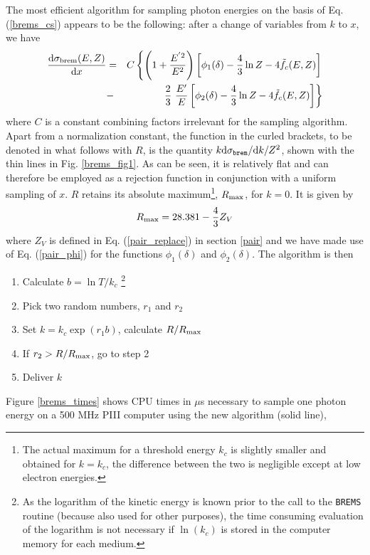 The most efficient algorithm for sampling photon energies on
the basis of Eq. (\ref{brems_cs}) appears to be the following:
after a change of variables from $k$ to $x$, we have
\begin{eqnarray}
{{\rm d} \sigma_{\rm brem}(E,Z) \over {\rm d} x} & = & C
\left\{ \left(1 + {E^{' 2} \over E^2} \right)
\left[ \phi_1(\delta) - \frac{4}{3} \ln Z - 4 \tilde{f}_c(E,Z) \right]
\right. \nonumber \\ & - & \left.
\frac{2}{3}~\frac{E'}{E} \left[\phi_2(\delta) -
\frac{4}{3} \ln Z - 4 \tilde{f}_c(E,Z) \right]
\right\}
\end{eqnarray}
where $C$ is a constant combining factors irrelevant for
the sampling algorithm. Apart from a normalization
constant, the function in the curled brackets, to be denoted
in what follows with $R$, is the
quantity $k {\rm d}\sigma_{\tt brem}/{\rm d}k/Z^2$, shown
with the thin lines in Fig. \ref{brems_fig1}. As can be seen,
it is relatively flat and can therefore be employed as a
rejection function in conjunction with a uniform sampling
of $x$. $R$ retains its absolute maximum\footnote{The actual maximum
for a threshold energy
$k_c$ is slightly smaller and obtained for $k=k_c$, the difference between the
two is negligible except at low electron energies.}, $R_{\rm max}$, for
$k = 0$. It is given by
\begin{equation}
R_{\rm max} = 28.381 - \frac{4}{3} Z_V
\end{equation}
where $Z_V$ is defined in Eq. (\ref{pair_replace}) in section \ref{pair}
and we have made use of Eq. (\ref{pair_phi}) for the functions
$\phi_1(\delta)$ and $\phi_2(\delta)$.
The algorithm is then
\begin{enumerate}
\item
Calculate $b = \ln T/k_c$ \footnote{As the logarithm of the kinetic
energy is known prior to the call to the {\tt BREMS} routine
(because also used for other purposes), the time consuming
evaluation of the logarithm is not necessary if $\ln(k_c)$ is
stored in the computer memory for each medium.}
\item
Pick two random numbers, $r_1$ and $r_2$
\item
Set $k = k_c \exp(r_1 b)$, calculate $R/R_{\rm max}$
\item
If $r_2 > R/R_{\rm max}$, go to step 2
\item
Deliver $k$
\end{enumerate}
Figure \ref{brems_times} shows CPU times in $\mu$s necessary to sample one
photon energy on a 500 MHz PIII computer
using the new algorithm (solid line),
